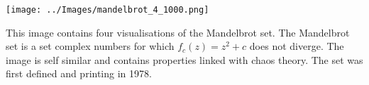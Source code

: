 \documentclass[10pt,a4paper]{article}
\begin{document}
\vspace*{\fill}
\begin{center}
\texttt{[image: ../Images/mandelbrot\_4\_1000.png]}
\end{center}
\vspace*{\fill}

\begin{center}
\tiny
This image contains four visualisations of the Mandelbrot set. The Mandelbrot set is a set complex numbers for which $f_c(z) = z^2 + c$ does not diverge. The image is self similar and contains properties linked with chaos theory. The set was first defined and printing in 1978.
\end{center}
\end{document}
